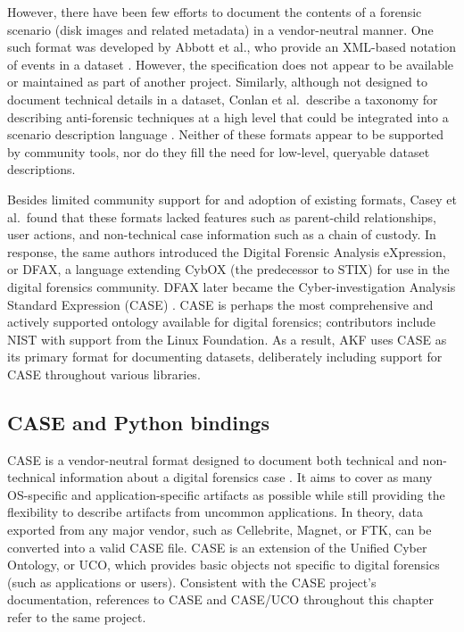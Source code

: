 \documentclass[letterpaper,12pt]{report}
\begin{document}
However, there have been few efforts to document the contents of a
forensic scenario (disk images and related metadata) in a vendor-neutral
manner. One such format was developed by Abbott et al., who provide an
XML-based notation of events in a dataset
\cite{abbottAutomatedRecognitionEvent2006}. However, the
specification does not appear to be available or maintained as part of
another project. Similarly, although not designed to document technical
details in a dataset, Conlan et al.~describe a taxonomy for describing
anti-forensic techniques at a high level that could be integrated into a
scenario description language
\cite{conlanAntiforensicsFurtheringDigital2016}. Neither of these
formats appear to be supported by community tools, nor do they fill the
need for low-level, queryable dataset descriptions.

Besides limited community support for and adoption of existing formats,
Casey et al.~found that these formats lacked features such as
parent-child relationships, user actions, and non-technical case
information such as a chain of custody. In response, the same authors
introduced the Digital Forensic Analysis eXpression, or DFAX, a language
extending CybOX (the predecessor to STIX) for use in the digital
forensics community. DFAX later became the Cyber-investigation Analysis
Standard Expression (CASE)
\cite{caseyAdvancingCoordinatedCyberinvestigations2017}. CASE is
perhaps the most comprehensive and actively supported ontology available
for digital forensics; contributors include NIST with support from the
Linux Foundation. As a result, AKF uses CASE as its primary format for
documenting datasets, deliberately including support for CASE throughout
various libraries.

\subsection{CASE and Python
bindings}\label{case-and-python-bindings}

CASE is a vendor-neutral format designed to document both technical and
non-technical information about a digital forensics case
\cite{caseyAdvancingCoordinatedCyberinvestigations2017}. It aims to
cover as many OS-specific and application-specific artifacts as possible
while still providing the flexibility to describe artifacts from
uncommon applications. In theory, data exported from any major vendor,
such as Cellebrite, Magnet, or FTK, can be converted into a valid CASE
file. CASE is an extension of the Unified Cyber Ontology, or UCO, which
provides basic objects not specific to digital forensics (such as
applications or users). Consistent with the CASE project's
documentation, references to CASE and CASE/UCO throughout this chapter
refer to the same project.
\end{document}
